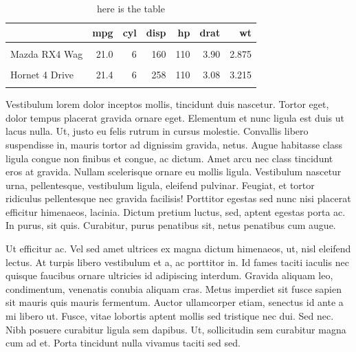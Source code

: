 \documentclass[
  9pt,
  letterpaper,
  DIV=11,
  numbers=noendperiod]{scrartcl}
\begin{document}
\begin{table}

\caption{\label{tbl-wrap2}here is the table}
\centering
\fontsize{7}{9}\selectfont
\begin{tabular}[t]{lrrrrrr}
\toprule
  & mpg & cyl & disp & hp & drat & wt\\
\midrule
\cellcolor{gray!6}{Mazda RX4} & \cellcolor{gray!6}{21.0} & \cellcolor{gray!6}{6} & \cellcolor{gray!6}{160} & \cellcolor{gray!6}{110} & \cellcolor{gray!6}{3.90} & \cellcolor{gray!6}{2.620}\\
Mazda RX4 Wag & 21.0 & 6 & 160 & 110 & 3.90 & 2.875\\
\cellcolor{gray!6}{Datsun 710} & \cellcolor{gray!6}{22.8} & \cellcolor{gray!6}{4} & \cellcolor{gray!6}{108} & \cellcolor{gray!6}{93} & \cellcolor{gray!6}{3.85} & \cellcolor{gray!6}{2.320}\\
Hornet 4 Drive & 21.4 & 6 & 258 & 110 & 3.08 & 3.215\\
\cellcolor{gray!6}{Hornet Sportabout} & \cellcolor{gray!6}{18.7} & \cellcolor{gray!6}{8} & \cellcolor{gray!6}{360} & \cellcolor{gray!6}{175} & \cellcolor{gray!6}{3.15} & \cellcolor{gray!6}{3.440}\\
\bottomrule
\end{tabular}
\end{table}

Vestibulum lorem dolor inceptos mollis, tincidunt duis nascetur. Tortor
eget, dolor tempus placerat gravida ornare eget. Elementum et nunc
ligula est duis ut lacus nulla. Ut, justo eu felis rutrum in cursus
molestie. Convallis libero suspendisse in, mauris tortor ad dignissim
gravida, netus. Augue habitasse class ligula congue non finibus et
congue, ac dictum. Amet arcu nec class tincidunt eros at gravida. Nullam
scelerisque ornare eu mollis ligula. Vestibulum nascetur urna,
pellentesque, vestibulum ligula, eleifend pulvinar. Feugiat, et tortor
ridiculus pellentesque nec gravida facilisis! Porttitor egestas sed nunc
nisi placerat efficitur himenaeos, lacinia. Dictum pretium luctus, sed,
aptent egestas porta ac. In purus, sit quis. Curabitur, purus penatibus
sit, netus penatibus cum augue.

Ut efficitur ac. Vel sed amet ultrices ex magna dictum himenaeos, ut,
nisl eleifend lectus. At turpis libero vestibulum et a, ac porttitor in.
Id fames taciti iaculis nec quisque faucibus ornare ultricies id
adipiscing interdum. Gravida aliquam leo, condimentum, venenatis conubia
aliquam cras. Metus imperdiet sit fusce sapien sit mauris quis mauris
fermentum. Auctor ullamcorper etiam, senectus id ante a mi libero ut.
Fusce, vitae lobortis aptent mollis sed tristique nec dui. Sed nec. Nibh
posuere curabitur ligula sem dapibus. Ut, sollicitudin sem curabitur
magna cum ad et. Porta tincidunt nulla vivamus taciti sed sed.
\end{document}
